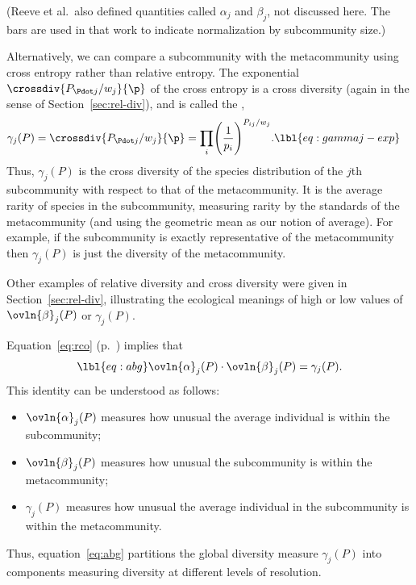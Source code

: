(Reeve et al.\ also defined quantities called $\alpha_j$ and $\beta_j$, not
discussed here.  The bars are used in that work to indicate normalization
by subcommunity size.)

Alternatively, we can compare a subcommunity with the metacommunity using
cross%
%
% 
entropy rather than relative entropy.  The exponential
$\crossdiv{P_{\Pdot j}/w_j}{\p}$ of the cross entropy is a cross%
%
% 
diversity (again in the sense of Section~\ref{sec:rel-div}), and is called
the ,
% 
\begin{align}
\gamma_j(P)     &
=
\crossdiv{P_{\Pdot j}/w_j}{\p}
=
\prod_i \Biggl( \frac{1}{p_i} \Biggr)^{P_{ij}/w_j}.
\lbl{eq:gammaj-exp}
\end{align}
% 
Thus, $\gamma_j(P)$ is the cross diversity of the species distribution of
the $j$th subcommunity with respect to that of the metacommunity.  It is
the average rarity of species in the subcommunity, measuring rarity by the
standards of the metacommunity (and using the geometric mean as our notion
of average).  For example, if the subcommunity is exactly representative of
the metacommunity then $\gamma_j(P)$ is just the diversity of the
metacommunity. 

Other examples of relative diversity and cross diversity were given in
Section~\ref{sec:rel-div}, illustrating the ecological meanings of high or
low values of $\ovln{\beta}_j(P)$ or $\gamma_j(P)$.

Equation~\eqref{eq:rco} (p.~\pageref{eq:rco}) implies that
% 
\begin{equation}
\lbl{eq:abg}
\ovln{\alpha}_j(P) \cdot \ovln{\beta}_j(P) = \gamma_j(P).
\end{equation}
% 
This identity can be understood as follows:
% 
\begin{itemize}
\item
$\ovln{\alpha}_j(P)$ measures how unusual
the average individual is within the subcommunity;

\item
$\ovln{\beta}_j(P)$ measures how unusual the subcommunity is within the
  metacommunity;

\item
$\gamma_j(P)$ measures how unusual the average individual in the
  subcommunity is within the metacommunity.
\end{itemize}
% 
Thus, equation~\eqref{eq:abg} partitions%
%
%
% 
the global diversity measure $\gamma_j(P)$ into components measuring
diversity at different levels of resolution.


